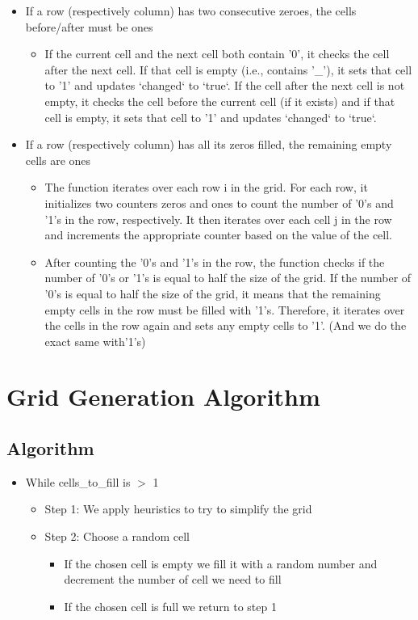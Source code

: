 \documentclass{article}
\begin{document}
\begin{itemize}
  \item If a row (respectively column) has two consecutive zeroes, the cells before/after must be ones
  \begin{itemize}
    \item If the current cell and the next cell both contain '0', it checks the cell after the next cell. If that cell is empty (i.e., contains '\_'), it sets that cell to '1' and updates `changed` to `true`. If the cell after the next cell is not empty, it checks the cell before the current cell (if it exists) and if that cell is empty, it sets that cell to '1' and updates `changed` to `true`.
    \end{itemize}
  \item If a row (respectively column) has all its zeros filled, the remaining empty cells are ones
    \begin{itemize}
    \item The function iterates over each row i in the grid. For each row, it initializes two counters zeros and ones to count the number of '0's and '1's in the row, respectively. It then iterates over each cell j in the row and increments the appropriate counter based on the value of the cell.
    \item After counting the '0's and '1's in the row, the function checks if the number of '0's or '1's is equal to half the size of the grid. If the number of '0's is equal to half the size of the grid, it means that the remaining empty cells in the row must be filled with '1's. Therefore, it iterates over the cells in the row again and sets any empty cells to '1'. (And we do the exact same with'1's)
    \end{itemize}
\end{itemize}

\section{Grid Generation Algorithm}
\subsection{Algorithm}

\begin{itemize}
    \item While cells\_to\_fill is $>$ 1
    \begin{itemize}
        \item Step 1: We apply heuristics to try to simplify the grid
        \item Step 2: Choose a random cell
        \begin{itemize}
            \item If the chosen cell is empty we fill it with a random number and decrement the number of cell we need to fill
            \item If the chosen cell is full we return to step 1
        \end{itemize}
    \end{itemize}
\end{itemize}
\end{document}
